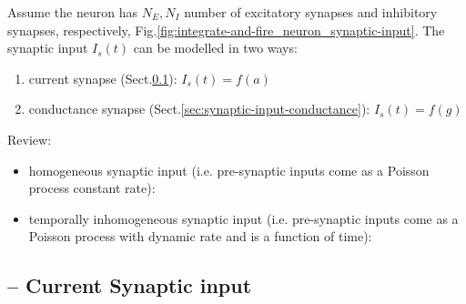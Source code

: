 %  
Assume the neuron has $N_E, N_I$ number of excitatory synapses and inhibitory
synapses, respectively, Fig.\ref{fig:integrate-and-fire_neuron_synaptic-input}.
The synaptic input $I_s(t)$ can be modelled in two ways:
\begin{enumerate}
  \item current synapse (Sect.\ref{sec:synaptic-input-current}): $I_s(t) = f(a)$
  \item conductance synapse (Sect.\ref{sec:synaptic-input-conductance}): $I_s(t) = f(g)$
\end{enumerate}
  
Review: 
\begin{itemize}
  \item homogeneous synaptic input (i.e. pre-synaptic inputs come as a Poisson
  process constant rate):
  \citep{burkitt2006a}
  \item temporally inhomogeneous synaptic input (i.e. pre-synaptic inputs come
  as a Poisson process with dynamic rate and is a function of time):
  \citep{burkitt2006b}
\end{itemize}




\subsection{ -- Current Synaptic input}
\label{sec:synaptic-input-current}


